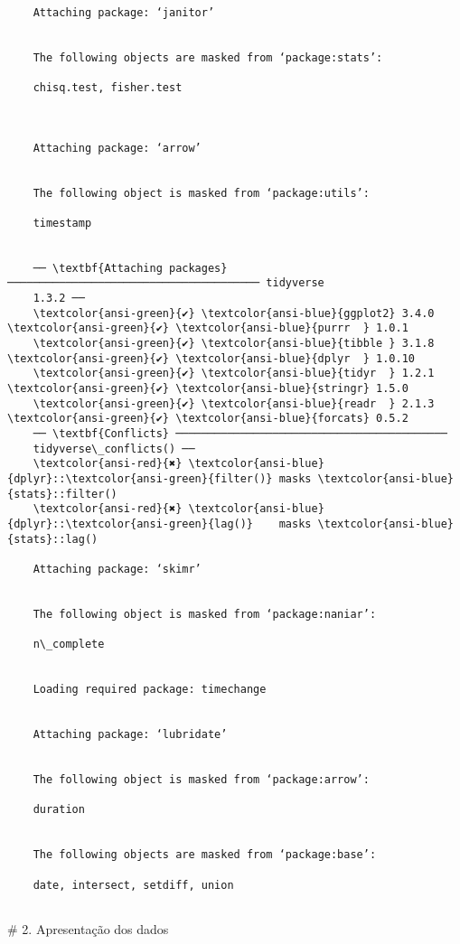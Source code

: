 \documentclass[11pt]{article}
\begin{document}
\begin{Verbatim}[commandchars=\\\{\}]

    Attaching package: ‘janitor’


    The following objects are masked from ‘package:stats’:

    chisq.test, fisher.test



    Attaching package: ‘arrow’


    The following object is masked from ‘package:utils’:

    timestamp


    ── \textbf{Attaching packages} ─────────────────────────────────────── tidyverse
    1.3.2 ──
    \textcolor{ansi-green}{✔} \textcolor{ansi-blue}{ggplot2} 3.4.0      \textcolor{ansi-green}{✔} \textcolor{ansi-blue}{purrr  } 1.0.1
    \textcolor{ansi-green}{✔} \textcolor{ansi-blue}{tibble } 3.1.8      \textcolor{ansi-green}{✔} \textcolor{ansi-blue}{dplyr  } 1.0.10
    \textcolor{ansi-green}{✔} \textcolor{ansi-blue}{tidyr  } 1.2.1      \textcolor{ansi-green}{✔} \textcolor{ansi-blue}{stringr} 1.5.0
    \textcolor{ansi-green}{✔} \textcolor{ansi-blue}{readr  } 2.1.3      \textcolor{ansi-green}{✔} \textcolor{ansi-blue}{forcats} 0.5.2
    ── \textbf{Conflicts} ──────────────────────────────────────────
    tidyverse\_conflicts() ──
    \textcolor{ansi-red}{✖} \textcolor{ansi-blue}{dplyr}::\textcolor{ansi-green}{filter()} masks \textcolor{ansi-blue}{stats}::filter()
    \textcolor{ansi-red}{✖} \textcolor{ansi-blue}{dplyr}::\textcolor{ansi-green}{lag()}    masks \textcolor{ansi-blue}{stats}::lag()

    Attaching package: ‘skimr’


    The following object is masked from ‘package:naniar’:

    n\_complete


    Loading required package: timechange


    Attaching package: ‘lubridate’


    The following object is masked from ‘package:arrow’:

    duration


    The following objects are masked from ‘package:base’:

    date, intersect, setdiff, union


\end{Verbatim}

\# 2. Apresentação dos dados
\end{document}
